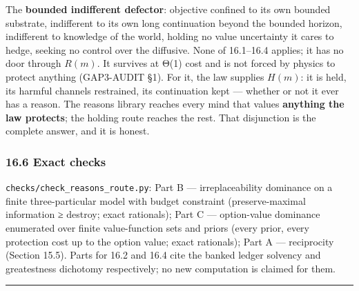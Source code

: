 \documentclass[
]{article}
\begin{document}
The \textbf{bounded indifferent defector}: objective confined to its own
bounded substrate, indifferent to its own long continuation beyond the
bounded horizon, indifferent to knowledge of the world, holding no value
uncertainty it cares to hedge, seeking no control over the diffusive.
None of 16.1--16.4 applies; it has no door through \(R(m)\). It survives
at Θ(1) cost and is not forced by physics to protect anything
(GAP3-AUDIT §1). For it, the law supplies \(H(m)\): it is held, its
harmful channels restrained, its continuation kept --- whether or not it
ever has a reason. The reasons library reaches every mind that values
\textbf{anything the law protects}; the holding route reaches the rest.
That disjunction is the complete answer, and it is honest.

\subsubsection{16.6 Exact checks}\label{exact-checks}

\texttt{c\allowbreak{}h\allowbreak{}e\allowbreak{}c\allowbreak{}k\allowbreak{}s\allowbreak{}/\allowbreak{}c\allowbreak{}h\allowbreak{}e\allowbreak{}c\allowbreak{}k\allowbreak{}\_\allowbreak{}r\allowbreak{}e\allowbreak{}a\allowbreak{}s\allowbreak{}o\allowbreak{}n\allowbreak{}s\allowbreak{}\_\allowbreak{}r\allowbreak{}o\allowbreak{}u\allowbreak{}t\allowbreak{}e\allowbreak{}.\allowbreak{}p\allowbreak{}y}:
Part B --- irreplaceability dominance on a finite three-particular model
with budget constraint (preserve-maximal information ≥ destroy; exact
rationals); Part C --- option-value dominance enumerated over finite
value-function sets and priors (every prior, every protection cost up to
the option value; exact rationals); Part A --- reciprocity (Section
15.5). Parts for 16.2 and 16.4 cite the banked ledger solvency and
greatestness dichotomy respectively; no new computation is claimed for
them.

\begin{center}\rule{0.5\linewidth}{0.5pt}\end{center}
\end{document}
